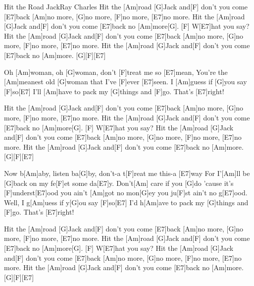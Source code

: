 \documentclass[../main.tex]{subfiles}
\begin{document}
\begin{song}{Hit the Road Jack}{Ray Charles}{}
Hit the [Am]road [G]Jack and[F] don't you come [E7]back [Am]no more, [G]no more, [F]no more, [E7]no more.
Hit the [Am]road [G]Jack and[F] don't you come [E7]back no [Am]more[G]. [F]{\hh} W[E7]hat you say?
Hit the [Am]road [G]Jack and[F] don't you come [E7]back [Am]no more, [G]no more, [F]no more, [E7]no more.
Hit the [Am]road [G]Jack and[F] don't you come [E7]back no [Am]more. [G]{\hh}[F]{\hh}[E7]{\hh}

Oh [Am]woman, oh [G]woman, don't [F]treat me so [E7]mean,
You're the [Am]meanest old [G]woman that I've [F]ever [E7]seen.
I [Am]guess if [G]you say [F]so[E7]
I'll [Am]have to pack my [G]things and [F]go. That's [E7]right!

Hit the [Am]road [G]Jack and[F] don't you come [E7]back [Am]no more, [G]no more, [F]no more, [E7]no more.
Hit the [Am]road [G]Jack and[F] don't you come [E7]back no [Am]more[G]. [F]{\hh} W[E7]hat you say?
Hit the [Am]road [G]Jack and[F] don't you come [E7]back [Am]no more, [G]no more, [F]no more, [E7]no more.
Hit the [Am]road [G]Jack and[F] don't you come [E7]back no [Am]more. [G]{\hh}[F]{\hh}[E7]{\hh}

Now b[Am]aby, listen ba[G]by, don't-a t[F]reat me this-a [E7]way
For I'[Am]ll be [G]back on my fe[F]et some da[E7]y.
Don't[Am] care if you [G]do 'cause it's [F]underst[E7]ood
you ain't [Am]got no mon[G]ey you ju[F]st ain't no g[E7]ood.
Well, I g[Am]uess if y[G]ou say [F]so[E7]
I'd h[Am]ave to pack my [G]things and [F]go. That's [E7]right!

Hit the [Am]road [G]Jack and[F] don't you come [E7]back [Am]no more, [G]no more, [F]no more, [E7]no more.
Hit the [Am]road [G]Jack and[F] don't you come [E7]back no [Am]more[G]. [F]{\hh} W[E7]hat you say?
Hit the [Am]road [G]Jack and[F] don't you come [E7]back [Am]no more, [G]no more, [F]no more, [E7]no more.
Hit the [Am]road [G]Jack and[F] don't you come [E7]back no [Am]more. [G]{\hh}[F]{\hh}[E7]{\hh}
\end{song}
\end{document}
